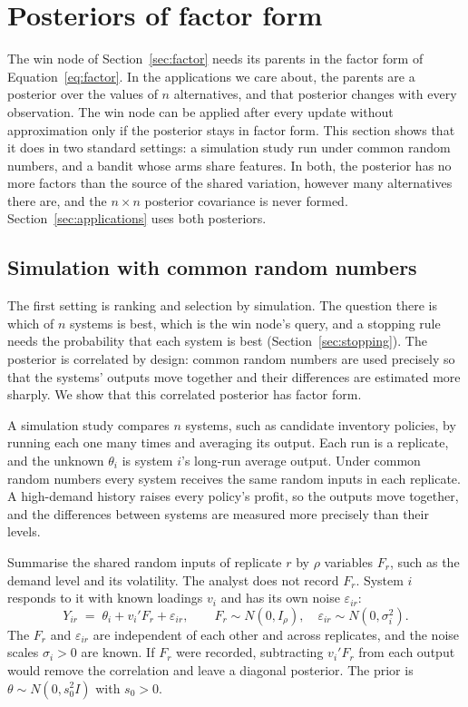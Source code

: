 \documentclass[11pt]{article}
\begin{document}
\section{Posteriors of factor form}
\label{sec:posteriors}

The win node of Section~\ref{sec:factor} needs its parents in the
factor form of Equation~\eqref{eq:factor}. In the applications we
care about, the parents are a posterior over the values of $n$
alternatives, and that posterior changes with every observation. The
win node can be applied after every update without approximation only
if the posterior stays in factor form. This section shows that it does
in two standard settings: a simulation study run under common random
numbers, and a bandit whose arms share features. In both, the
posterior has no more factors than the source of the shared variation,
however many alternatives there are, and the $n\times n$ posterior
covariance is never formed. Section~\ref{sec:applications} uses both
posteriors.

\subsection{Simulation with common random numbers}
\label{sec:crn}

The first setting is ranking and selection by simulation. The
question there is which of $n$ systems is best, which is the win
node's query, and a stopping rule needs the probability that each
system is best (Section~\ref{sec:stopping}). The posterior is
correlated by design: common random numbers are used precisely so
that the systems' outputs move together and their differences are
estimated more sharply. We show that this correlated posterior has
factor form.

A simulation study compares $n$ systems, such as candidate inventory
policies, by running each one many times and averaging its output.
Each run is a replicate, and the unknown $\theta_i$ is system $i$'s
long-run average output. Under common random numbers every system
receives the same random inputs in each replicate. A high-demand
history raises every policy's profit, so the outputs move together,
and the differences between systems are measured more precisely than
their levels.

Summarise the shared random inputs of replicate $r$ by $\rho$
variables $F_r$, such as the demand level and its volatility. The
analyst does not record $F_r$. System $i$ responds to it with known
loadings $v_i$ and has its own noise $\varepsilon_{ir}$:
\begin{equation}
Y_{ir} \;=\; \theta_i + v_i' F_r + \varepsilon_{ir}, \qquad
F_r \sim N(0, I_\rho), \quad \varepsilon_{ir} \sim N(0, \sigma_i^2).
\end{equation}
The $F_r$ and $\varepsilon_{ir}$ are independent of each other and
across replicates, and the noise scales $\sigma_i>0$ are known. If
$F_r$ were recorded, subtracting $v_i' F_r$ from each output would
remove the correlation and leave a diagonal posterior. The prior is
$\theta \sim N(0, s_0^2 I)$ with $s_0 > 0$.
\end{document}
